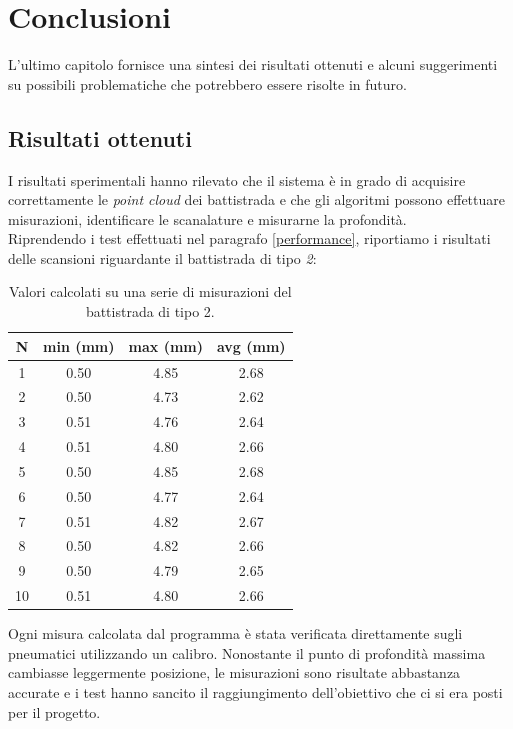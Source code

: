 \chapter{Conclusioni}
\label{Cha:conclusioni}
\thispagestyle{empty}

L'ultimo capitolo fornisce una sintesi dei risultati ottenuti e alcuni suggerimenti su possibili problematiche che potrebbero essere risolte in futuro.

\section{Risultati ottenuti}
I risultati sperimentali hanno rilevato che il sistema è in grado di acquisire correttamente le \textit{point cloud} dei battistrada e che gli algoritmi possono effettuare misurazioni, identificare le scanalature e misurarne la profondità.\\
\newline
Riprendendo i test effettuati nel paragrafo \ref{performance}, riportiamo i risultati delle scansioni riguardante il battistrada di tipo \textit{2}:

\begin{table}[H]
\centering
\begin{tabular}{||c c c c||} 
 \hline
 N & min (mm) & max (mm) & avg (mm) \\ [0.5ex]
 \hline\hline
 1 & 0.50 & 4.85 & 2.68 \\ 
 \hline
 2 & 0.50 & 4.73 & 2.62 \\
 \hline
 3 & 0.51 & 4.76 & 2.64 \\
 \hline
 4 & 0.51 & 4.80 & 2.66 \\
 \hline
 5 & 0.50 & 4.85 & 2.68 \\
 \hline
 6 & 0.50 & 4.77 & 2.64 \\
 \hline
 7 & 0.51 & 4.82 & 2.67 \\
 \hline
 8 & 0.50 & 4.82 & 2.66 \\
 \hline
 9 & 0.50 & 4.79 & 2.65 \\
 \hline
 10 & 0.51 & 4.80 & 2.66 \\
 \hline
\end{tabular}
\caption{Valori calcolati su una serie di misurazioni del battistrada di tipo 2.}
\label{table:1}
\end{table}

\noindent Ogni misura calcolata dal programma è stata verificata direttamente sugli pneumatici utilizzando un calibro. Nonostante il punto di profondità massima cambiasse leggermente posizione, le misurazioni sono risultate abbastanza accurate e i test hanno sancito il raggiungimento dell'obiettivo che ci si era posti per il progetto.\\

